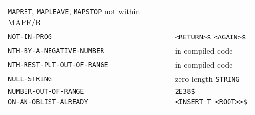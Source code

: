 \documentclass[a4paper]{scrbook}
\begin{document}
\begin{longtable}[]{@{}ll@{}}
\begin{minipage}[t]{0.36\columnwidth}
\texttt{MAPRET}, \texttt{MAPLEAVE}, \texttt{MAPSTOP} not within MAPF/R\strut
\end{minipage}\tabularnewline
\begin{minipage}[t]{0.58\columnwidth}\raggedright\strut
\texttt{NOT-IN-PROG}\strut
\end{minipage} & \begin{minipage}[t]{0.36\columnwidth}\raggedright\strut
\texttt{\textless{}RETURN\textgreater{}\$} \texttt{\textless{}AGAIN\textgreater{}\$}\strut
\end{minipage}\tabularnewline
\begin{minipage}[t]{0.58\columnwidth}\raggedright\strut
\texttt{NTH-BY-A-NEGATIVE-NUMBER}\strut
\end{minipage} & \begin{minipage}[t]{0.36\columnwidth}\raggedright\strut
in compiled code\strut
\end{minipage}\tabularnewline
\begin{minipage}[t]{0.58\columnwidth}\raggedright\strut
\texttt{NTH-REST-PUT-OUT-OF-RANGE}\strut
\end{minipage} & \begin{minipage}[t]{0.36\columnwidth}\raggedright\strut
in compiled code\strut
\end{minipage}\tabularnewline
\begin{minipage}[t]{0.58\columnwidth}\raggedright\strut
\texttt{NULL-STRING}\strut
\end{minipage} & \begin{minipage}[t]{0.36\columnwidth}\raggedright\strut
zero-length \texttt{STRING}\strut
\end{minipage}\tabularnewline
\begin{minipage}[t]{0.58\columnwidth}\raggedright\strut
\texttt{NUMBER-OUT-OF-RANGE}\strut
\end{minipage} & \begin{minipage}[t]{0.36\columnwidth}\raggedright\strut
\texttt{2E38\$}\strut
\end{minipage}\tabularnewline
\begin{minipage}[t]{0.58\columnwidth}\raggedright\strut
\texttt{ON-AN-OBLIST-ALREADY}\strut
\end{minipage} & \begin{minipage}[t]{0.36\columnwidth}\raggedright\strut
\texttt{\textless{}INSERT\ T\ \textless{}ROOT\textgreater{}\textgreater{}\$}\strut
\end{minipage}\tabularnewline
\begin{minipage}[t]{0.58\columnwidth}\raggedright\strut

\end{minipage}
\end{longtable}
\end{document}

